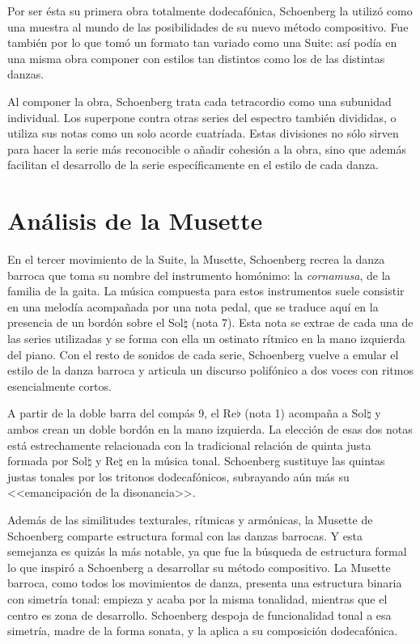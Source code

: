        Por ser ésta su primera obra totalmente dodecafónica, Schoenberg la utilizó como una muestra al mundo de las posibilidades de su nuevo método compositivo. Fue también por lo que tomó un formato tan variado como una Suite: así podía en una misma obra componer con estilos tan distintos como los de las distintas danzas.
        
        Al componer la obra, Schoenberg trata cada tetracordio como una subunidad individual. Los superpone contra otras series del espectro también divididas, o utiliza sus notas como un solo acorde cuatríada. Estas divisiones no sólo sirven para hacer la serie más reconocible o añadir cohesión a la obra, sino que además facilitan el desarrollo de la serie específicamente en el estilo de cada danza.
		
	\section{Análisis de la Musette}
	\label{musette}
		En el tercer movimiento de la Suite, la Musette, Schoenberg recrea la danza barroca que toma su nombre del instrumento homónimo: la \emph{cornamusa}, de la familia de la gaita. La música compuesta para estos instrumentos suele consistir en una melodía acompañada por una nota pedal, que se traduce aquí en la presencia de un bordón sobre el Sol$\natural$ (nota 7). Esta nota se extrae de cada una de las series utilizadas y se forma con ella un ostinato rítmico en la mano izquierda del piano. Con el resto de sonidos de cada serie, Schoenberg vuelve a emular el estilo de la danza barroca y articula un discurso polifónico a dos voces con ritmos esencialmente cortos.
		
		A partir de la doble barra del compás 9, el Re$\flat$ (nota 1) acompaña a Sol$\natural$ y ambos crean un doble bordón en la mano izquierda. La elección de esas dos notas está estrechamente relacionada con la tradicional relación de quinta justa formada por Sol$\natural$ y Re$\natural$ en la música tonal. Schoenberg sustituye las quintas justas tonales por los tritonos dodecafónicos, subrayando aún más su <<emancipación de la disonancia>>.
		
		Además de las similitudes texturales, rítmicas y armónicas, la Musette de Schoenberg comparte estructura formal con las danzas barrocas. Y esta semejanza es quizás la más notable, ya que fue la búsqueda de estructura formal lo que inspiró a Schoenberg a desarrollar su método compositivo. La Musette barroca, como todos los movimientos de danza, presenta una estructura binaria con simetría tonal: empieza y acaba por la misma tonalidad, mientras que el centro es zona de desarrollo. Schoenberg despoja de funcionalidad tonal a esa simetría, madre de la forma sonata, y la aplica a su composición dodecafónica.
		
